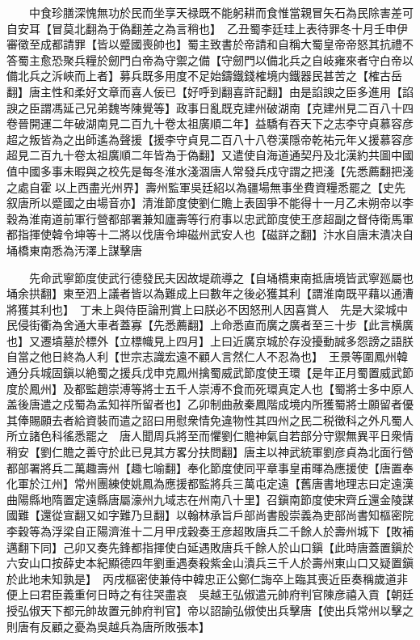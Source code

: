 　　中食珍膳深愧無功於民而坐享天禄既不能躬耕而食惟當親冒矢石為民除害差可自安耳【冒莫北翻為于偽翻差之為言稍也】　乙丑蜀李廷珪上表待罪冬十月壬申伊審徵至成都請罪【皆以蹙國喪帥也】蜀主致書於帝請和自稱大蜀皇帝帝怒其抗禮不答蜀主愈恐聚兵糧於劒門白帝為守禦之備【守劒門以備北兵之自岐雍來者守白帝以備北兵之泝峽而上者】募兵既多用度不足始鑄鐵錢榷境内鐵器民甚苦之【榷古岳翻】唐主性和柔好文章而喜人佞已【好呼到翻喜許記翻】由是諂諛之臣多進用【諂諛之臣謂馮延己兄弟魏岑陳覺等】政事日亂既克建州破湖南【克建州見二百八十四卷晉開運二年破湖南見二百九十卷太祖廣順二年】益驕有吞天下之志李守貞慕容彦超之叛皆為之出師遙為聲援【援李守貞見二百八十八卷漢隱帝乾祐元年乂援慕容彦超見二百九十卷太祖廣順二年皆為于偽翻】又遣使自海道通契丹及北漢約共圖中國值中國多事未暇與之校先是每冬淮水淺涸唐人常發兵戍守謂之把淺【先悉薦翻把淺之處自霍以上西盡光州界】壽州監軍吳廷紹以為疆場無事坐費資糧悉罷之【史先叙唐所以蹙國之由場音亦】清淮節度使劉仁贍上表固爭不能得十一月乙未朔帝以李穀為淮南道前軍行營都部署兼知廬壽等行府事以忠武節度使王彦超副之督侍衛馬軍都指揮使韓令坤等十二將以伐唐令坤磁州武安人也【磁詳之翻】汴水自唐末潰决自埇橋東南悉為汚澤上謀擊唐

　　先命武寧節度使武行德發民夫因故堤疏導之【自埇橋東南抵唐境皆武寧廵屬也埇余拱翻】東至泗上議者皆以為難成上曰數年之後必獲其利【謂淮南既平藉以通漕將獲其利也】　丁未上與侍臣論刑賞上曰朕必不因怒刑人因喜賞人　先是大梁城中民侵街衢為舍通大車者蓋寡【先悉薦翻】上命悉直而廣之廣者至三十步【此言横廣也】又遷墳墓於標外【立標幟見上四月】上曰近廣京城於存没擾動誠多怨謗之語朕自當之他日終為人利【世宗志識宏遠不顧人言然仁人不忍為也】　王景等圍鳳州韓通分兵城固鎭以絶蜀之援兵戊申克鳳州擒蜀威武節度使王環【是年正月蜀置威武節度於鳳州】及都監趙崇溥等將士五千人崇溥不食而死環真定人也【蜀將士多中原人盖後唐遣之戍蜀為孟知祥所留者也】乙卯制曲赦秦鳳階成境内所獲蜀將士願留者優其俸賜願去者給資裝而遣之詔曰用慰衆情免違物性其四州之民二税徵科之外凡蜀人所立諸色科徭悉罷之　唐人聞周兵將至而懼劉仁贍神氣自若部分守禦無異平日衆情稍安【劉仁贍之善守於此已見其方畧分扶問翻】唐主以神武統軍劉彦貞為北面行營都部署將兵二萬趣壽州【趣七喻翻】奉化節度使同平章事皇甫暉為應援使【唐置奉化軍於江州】常州團練使姚鳳為應援都監將兵三萬屯定遠【舊唐書地理志曰定遠漢曲陽縣地隋置定遠縣唐屬濠州九域志在州南八十里】召鎭南節度使宋齊丘還金陵謀國難【還從宣翻又如字難乃旦翻】以翰林承旨戶部尚書殷崇義為吏部尚書知樞密院　李穀等為浮梁自正陽濟淮十二月甲戌穀奏王彦超敗唐兵二千餘人於壽州城下【敗補邁翻下同】己卯又奏先鋒都指揮使白延遇敗唐兵千餘人於山口鎭【此時唐蓋置鎭於六安山口按薛史本紀顯德四年劉重遇奏殺紫金山潰兵三千人於壽州東山口又疑置鎭於此地未知孰是】　丙戌樞密使兼侍中韓忠正公鄭仁誨卒上臨其喪近臣奏稱歲道非便上曰君臣義重何日時之有往哭盡哀　吳越王弘俶遣元帥府判官陳彦禧入貢【朝廷授弘俶天下都元帥故置元帥府判官】帝以詔諭弘俶使出兵擊唐【使出兵常州以擊之則唐有反顧之憂為吳越兵為唐所敗張本】

